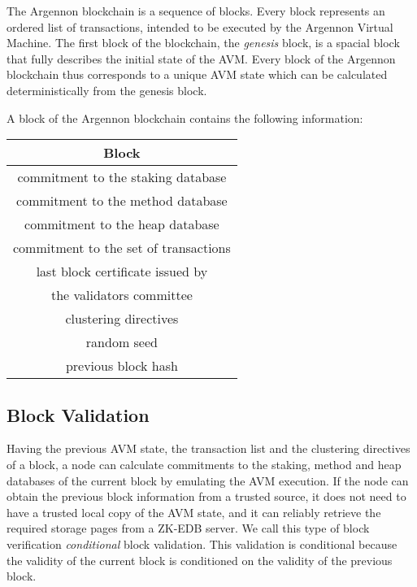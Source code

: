 
The Argennon blockchain is a sequence of blocks. Every block represents an ordered list of transactions, intended to be
executed by the Argennon Virtual Machine. The first block of the blockchain, the \emph{genesis} block, is a spacial
block that fully describes the initial state of the AVM. Every block of the Argennon blockchain thus corresponds to a
unique AVM state which can be calculated deterministically from the genesis block.

A block of the Argennon blockchain contains the following information:

\begin{center}
    \begin{tabular}{||c||}
        \hline
        \textbf{Block} \\ [0.5ex]
        \hline\hline
        commitment to the staking database            \\ [1.2ex]
        commitment to the method database             \\ [1.2ex]
        commitment to the heap database               \\ [1.2ex]
        commitment to the set of transactions         \\ [1.2ex]
        last block certificate issued by         \\
        the validators committee                      \\ [1.2ex]
        clustering directives                         \\ [1.2ex]
        random seed                                   \\ [1.2ex]
        previous block hash                           \\ [1.2ex]
        \hline
    \end{tabular}
\end{center}

\subsection{Block Validation}\label{subsec:block-validation}

Having the previous AVM state, the transaction list and the clustering directives of a block, a node can calculate
commitments to the staking, method and heap databases of the current block by emulating the AVM execution. If the
node can obtain the previous block information from a trusted source, it does not need to have a trusted local
copy of the AVM state,
and it can reliably retrieve the required storage pages from a ZK-EDB server. We call this type of block verification
\emph{conditional} block validation. This validation is conditional because the validity of the current block is
conditioned on the validity of the previous block.

